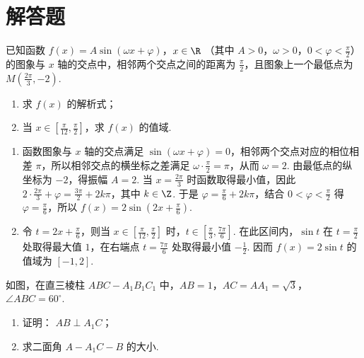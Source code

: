 \section{解答题}

\begin{problem}
已知函数 \(f\left(x\right) = A \sin\left(\omega x + \varphi\right)\)，\(x \in \R\) （其中 \(A > 0\)，\(\omega > 0\)，\(0 < \varphi < \frac{\pi}{2}\)）的图象与 \(x\) 轴的交点中，相邻两个交点之间的距离为 \( \frac{\pi}{2} \)，且图象上一个最低点为 \( M\left(\frac{2\pi}{3}, -2\right) \).

\begin{enumerate}
\item 求 \( f\left(x\right) \) 的解析式；
\item 当 \(x \in \left[\frac{\pi}{12}, \frac{\pi}{2}\right]\)，求 \(f\left(x\right)\) 的值域.
\end{enumerate}

\end{problem}

\begin{solution}
\begin{enumerate}
\item 函数图象与 \(x\) 轴的交点满足 \(\sin\left(\omega x+\varphi\right)=0\)，相邻两个交点对应的相位相差 \(\pi\)，所以相邻交点的横坐标之差满足 \(\omega\cdot\frac{\pi}{2}=\pi\)，从而 \(\omega=2\). 由最低点的纵坐标为 \(-2\)，得振幅 \(A=2\). 当 \(x=\frac{2\pi}{3}\) 时函数取得最小值，因此 \(2\cdot\frac{2\pi}{3}+\varphi=\frac{3\pi}{2}+2k\pi\)，其中 \(k\in\Z\). 于是 \(\varphi=\frac{\pi}{6}+2k\pi\)，结合 \(0<\varphi<\frac{\pi}{2}\) 得 \(\varphi=\frac{\pi}{6}\)，所以 \(f\left(x\right)=2\sin\left(2x+\frac{\pi}{6}\right)\).
\item 令 \(t=2x+\frac{\pi}{6}\)，则当 \(x\in\left[\frac{\pi}{12},\frac{\pi}{2}\right]\) 时，\(t\in\left[\frac{\pi}{3},\frac{7\pi}{6}\right]\). 在此区间内，\(\sin t\) 在 \(t=\frac{\pi}{2}\) 处取得最大值 \(1\)，在右端点 \(t=\frac{7\pi}{6}\) 处取得最小值 \(-\frac{1}{2}\). 因而 \(f\left(x\right)=2\sin t\) 的值域为 \(\left[-1,2\right]\).
\end{enumerate}
\end{solution}

\begin{problem}
如图，在直三棱柱 \( ABC - A_{1}B_{1}C_{1} \) 中，\( AB = 1 \)，\( AC = AA_{1} = \sqrt{3} \)，\( \angle ABC = 60^{\circ} \).

\begin{enumerate}
\item 证明： \( AB \perp A_{1}C \)；
\item 求二面角 \(A - A_{1}C - B\) 的大小.
\end{enumerate}

\end{problem}

